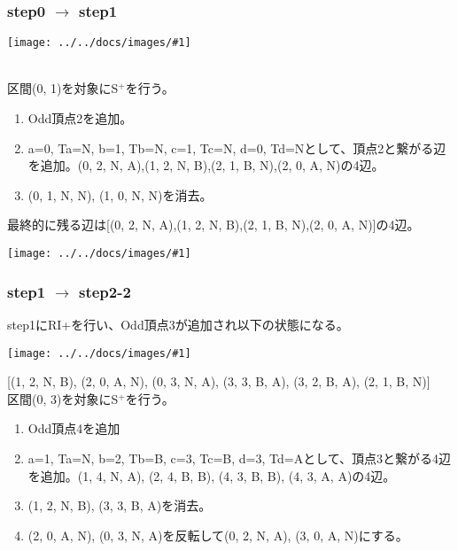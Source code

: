 \documentclass[11pt,a4j,draft]{jsreport}
\newcommand{\splus}{S${}^\text{+}$}
\newcommand{\ikeg}[1]{\texttt{[image: ../../docs/images/\#1]}}
\begin{document}
\subsubsection{step0 $\rightarrow$ step1}
\begin{center}
    \ikeg{step0.jpg}\\
\end{center}

\text{[(0, 1, N, N), (1, 0, N, N)]}\\

区間(0, 1)を対象に\splus を行う。\\
\begin{enumerate}
    \item Odd頂点2を追加。
    \item a=0, Ta=N, b=1, Tb=N, c=1, Tc=N, d=0, Td=Nとして、頂点2と繋がる辺を追加。(0, 2, N, A),(1, 2, N, B),(2, 1, B, N),(2, 0, A, N)の4辺。
    \item (0, 1, N, N), (1, 0, N, N)を消去。
\end{enumerate}

最終的に残る辺は[(0, 2, N, A),(1, 2, N, B),(2, 1, B, N),(2, 0, A, N)]の4辺。\\

\begin{center}
    \ikeg{step1.jpg}
\end{center}

\subsubsection{step1 $\rightarrow$ step2-2}
step1にRI+を行い、Odd頂点3が追加され以下の状態になる。
\begin{center}
    \ikeg{step1_riplus.jpg}\\
\end{center}
[(1, 2, N, B), (2, 0, A, N), (0, 3, N, A), (3, 3, B, A), (3, 2, B, A), (2, 1, B, N)]\\
区間(0, 3)を対象に\splus を行う。\\

\begin{enumerate}
    \item Odd頂点4を追加
    \item a=1, Ta=N, b=2, Tb=B, c=3, Tc=B, d=3, Td=Aとして、頂点3と繋がる4辺を追加。(1, 4, N, A), (2, 4, B, B), (4, 3, B, B), (4, 3, A, A)の4辺。
    \item (1, 2, N, B), (3, 3, B, A)を消去。
    \item (2, 0, A, N), (0, 3, N, A)を反転して(0, 2, N, A), (3, 0, A, N)にする。
\end{enumerate}
\end{document}

